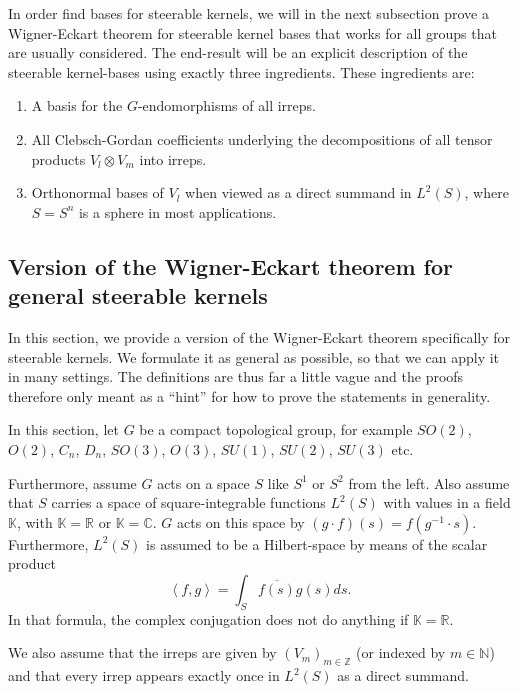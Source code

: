 \documentclass[12pt, a4paper]{article}
\theoremstyle{plain}
\theoremstyle{definition}
\theoremstyle{remark}
\newcommand{\N}{\mathds{N}}
\newcommand{\Z}{\mathds{Z}}
\newcommand{\R}{\mathds{R}}
\newcommand{\C}{\mathds{C}}
\newcommand{\K}{\mathds{K}}
\begin{document}
In order find bases for steerable kernels, we will in the next subsection prove a Wigner-Eckart theorem for steerable kernel bases that works for all groups that are usually considered. The end-result will be an explicit description of the steerable kernel-bases using exactly three ingredients. These ingredients are:

\begin{enumerate}
\item A basis for the $G$-endomorphisms of all irreps.
\item All Clebsch-Gordan coefficients underlying the decompositions of all tensor products $V_l \otimes V_m$ into irreps.
\item Orthonormal bases of $V_l$ when viewed as a direct summand in $L^2(S)$, where $S = S^n$ is a sphere in most applications.
\end{enumerate}

\subsection{Version of the Wigner-Eckart theorem for general steerable kernels}\label{general_wigner_eckart}

In this section, we provide a version of the Wigner-Eckart theorem specifically for steerable kernels. We formulate it as general as possible, so that we can apply it in many settings. The definitions are thus far a little vague and the proofs therefore only meant as a ``hint'' for how to prove the statements in generality. 

In this section, let $G$ be a compact topological group, for example $SO(2)$, $O(2)$, $C_n$, $D_n$, $SO(3)$, $O(3)$, $SU(1)$, $SU(2)$, $SU(3)$ etc.

Furthermore, assume $G$ acts on a space $S$ like $S^1$ or $S^2$ from the left. Also assume that $S$ carries a space of square-integrable functions $L^2(S)$ with values in a field $\K$, with $\K = \R$ or $\K = \C$. $G$ acts on this space by $(g \cdot f)(s) = f(g^{-1} \cdot s)$. Furthermore, $L^2(S)$ is assumed to be a Hilbert-space by means of the scalar product
\begin{equation*}
\left\langle f, g \right\rangle = \int_{S} \overline{f(s)} g(s) ds.
\end{equation*}
In that formula, the complex conjugation does not do anything if $\K = \R$. 

We also assume that the irreps are given by $(V_m)_{m \in \Z}$ (or indexed by $m \in \N$) and that every irrep appears exactly once in $L^2(S)$ as a direct summand. 
\end{document}
